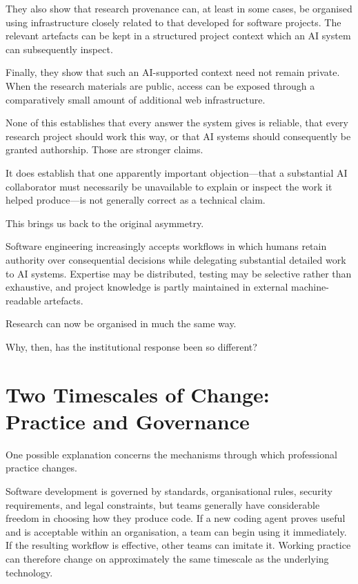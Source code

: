 They also show that research provenance can, at least in some cases, be organised using infrastructure closely related to that developed for software projects. The relevant artefacts can be kept in a structured project context which an AI system can subsequently inspect.

Finally, they show that such an AI-supported context need not remain private. When the research materials are public, access can be exposed through a comparatively small amount of additional web infrastructure.

None of this establishes that every answer the system gives is reliable, that every research project should work this way, or that AI systems should consequently be granted authorship. Those are stronger claims.

It does establish that one apparently important objection---that a substantial AI collaborator must necessarily be unavailable to explain or inspect the work it helped produce---is not generally correct as a technical claim.

This brings us back to the original asymmetry.

Software engineering increasingly accepts workflows in which humans retain authority over consequential decisions while delegating substantial detailed work to AI systems. Expertise may be distributed, testing may be selective rather than exhaustive, and project knowledge is partly maintained in external machine-readable artefacts.

Research can now be organised in much the same way.

Why, then, has the institutional response been so different?


\section{Two Timescales of Change: Practice and Governance}

One possible explanation concerns the mechanisms through which professional practice changes.

Software development is governed by standards, organisational rules, security requirements, and legal constraints, but teams generally have considerable freedom in choosing how they produce code. If a new coding agent proves useful and is acceptable within an organisation, a team can begin using it immediately. If the resulting workflow is effective, other teams can imitate it. Working practice can therefore change on approximately the same timescale as the underlying technology.

